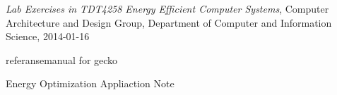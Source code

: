
\begin{thebibliography}{9}

  \emph{Lab Exercises in TDT4258 Energy Efficient Computer Systems},
  Computer Architecture and Design Group,
  Department of Computer and Information Science,
  2014-01-16

	referansemanual for gecko

	Energy Optimization Appliaction Note

\end{thebibliography}
